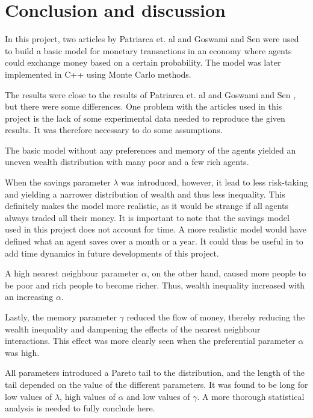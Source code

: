 \documentclass[11pt,a4paper,titlepage]{article}
\begin{document}
\section{Conclusion and discussion}
In this project, two articles by Patriarca et. al \cite{Patriarca} and  
Goswami and Sen \cite{Goswami} were used to build a basic model for monetary transactions in an economy where agents could exchange money based on a certain probability. The model was later implemented in C++ using Monte Carlo methods.

The results were close to the results of Patriarca et. al \cite{Patriarca} and Goswami and Sen \cite{Goswami}, but there were some differences. One problem with the articles used in this project is the lack of some experimental data needed to reproduce the given results. It was therefore necessary to do some assumptions.

The basic model without any preferences and memory of the agents yielded an uneven wealth distribution with many poor and a few rich agents. 

When the savings parameter $\lambda$ was introduced, however, it lead to less risk-taking and yielding a narrower distribution of wealth and thus less inequality. This definitely makes the model more realistic, as it would be strange if all agents always traded all their money. It is important to note that the savings model used in this project does not account for time. A more realistic model would have defined what an agent saves over a month or a year. It could thus be useful in to add time dynamics in future developments of this project. 

A high nearest neighbour parameter $\alpha$, on the other hand, caused more people to be poor and rich people to become richer. Thus, wealth inequality increased with an increasing $\alpha$. 

Lastly, the memory parameter $\gamma$ reduced the flow of money, thereby reducing the wealth inequality and dampening the effects of the nearest neighbour interactions. This effect was more clearly seen when the preferential parameter $\alpha$ was high. 

All parameters introduced a Pareto tail to the distribution, and the length of the tail depended on the value of the different parameters. It was found to be long for low values of $\lambda$, high values of $\alpha$ and low values of $\gamma$. A more thorough statistical analysis is needed to fully conclude here.  
\end{document}
